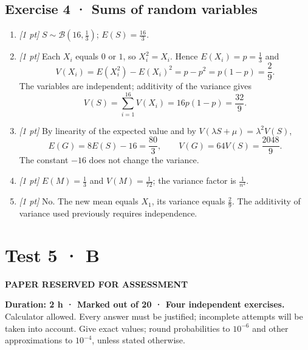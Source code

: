 \subsection*{Exercise 4 · Sums of random variables}\begin{enumerate}

\item \textit{[1 pt]} $S\sim\mathcal B(16,\frac{1}{3})$; $E(S)=\frac{16}{3}$.

\item \textit{[1 pt]} Each $X_i$ equals $0$ or $1$, so $X_i^2=X_i$. Hence $E(X_i)=p=\frac{1}{3}$ and
\[V(X_i)=E(X_i^2)-E(X_i)^2=p-p^2=p(1-p)=\frac{2}{9}.\]
The variables are independent; additivity of the variance gives
\[V(S)=\sum_{i=1}^{16}V(X_i)=16p(1-p)=\frac{32}{9}.\]

\item \textit{[1 pt]} By linearity of the expected value and by $V(\lambda S+\mu)=\lambda^2V(S)$,
\[E(G)=8E(S)-16=\frac{80}{3},\qquad V(G)=64V(S)=\frac{2048}{9}.\]
The constant $-16$ does not change the variance.

\item \textit{[1 pt]} $E(M)=\frac{1}{3}$ and $V(M)=\frac{1}{72}$; the variance factor is $\frac{1}{n^2}$.

\item \textit{[1 pt]} No. The new mean equals $X_1$, its variance equals $\frac{2}{9}$. The additivity of variance used previously requires independence.

\end{enumerate}

\fi

\fi

\ifprof

\clearpage{}\label{sujet:7-4}

\section*{Test 5 · B}

{\sffamily\bfseries\color{amber}PAPER RESERVED FOR ASSESSMENT\par}

\textbf{Duration: 2 h · Marked out of 20 · Four independent exercises.}\\Calculator allowed. Every answer must be justified; incomplete attempts will be taken into account. Give exact values; round probabilities to $10^{-6}$ and other approximations to $10^{-4}$, unless stated otherwise.

